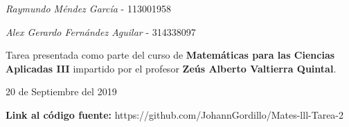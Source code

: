 \documentclass[10pt,letterpaper,fleqn]{article}
\begin{document}
\begin{titlepage}
	\vspace{1cm}    
    
    \large{\itshape{Raymundo Méndez García}} \small{ - 113001958} \\

	\vspace{1cm}    
    
    \large{\itshape{Alex Gerardo Fernández Aguilar}} \small{ - 314338097} \\
    
    \vspace{0.3cm}

    \vfill

    Tarea presentada como parte del curso de
    \textbf{Matemáticas para las Ciencias Aplicadas III}
    impartido por el profesor \textbf{Zeús Alberto Valtierra Quintal}. \par
    \vspace{0.2cm}
    {\large 20 de Septiembre del 2019\par}
    \vspace{0.3cm}
    \footnotesize{\textbf{Link al código fuente:} https://github.com/JohannGordillo/Mates-lll-Tarea-2}
\end{titlepage}
\end{document}

